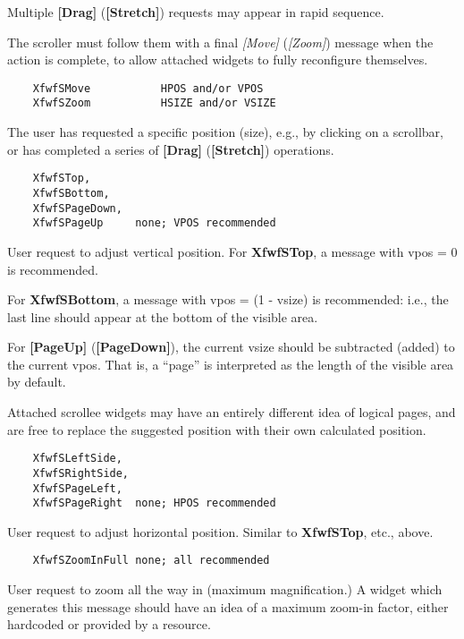         Multiple {\bf [Drag]} ({\bf [Stretch]}) requests may appear in
        rapid sequence.

	The scroller must follow them with a final {\it [Move]} ({\it [Zoom]})
        message when the action is complete, to allow attached widgets to
	fully reconfigure themselves.

\begin{verbatim}
    XfwfSMove           HPOS and/or VPOS
    XfwfSZoom           HSIZE and/or VSIZE
\end{verbatim}

	The user has requested a specific position (size), e.g., by
	clicking on a scrollbar, or has completed a series of {\bf [Drag]}
	({\bf [Stretch]}) operations.

\begin{verbatim}
    XfwfSTop,
    XfwfSBottom,
    XfwfSPageDown,
    XfwfSPageUp   	none; VPOS recommended
\end{verbatim}

    	User request to adjust vertical position.  For {\bf XfwfSTop}, a
	message with vpos = 0 is recommended.
 
	For {\bf XfwfSBottom}, a message with vpos = (1 - vsize) is
	recommended: i.e., the last line should appear at the bottom
	of the visible area.

	For {\bf [PageUp]} ({\bf [PageDown]}), the current vsize should be
	subtracted (added) to the current vpos.  That is, a ``page'' is
	interpreted as the length of the visible area by default.

	Attached scrollee widgets may have an entirely different idea
	of logical pages, and are free to replace the suggested
	position with their own calculated position.

\begin{verbatim}
    XfwfSLeftSide,
    XfwfSRightSide,
    XfwfSPageLeft,
    XfwfSPageRight	none; HPOS recommended
\end{verbatim}

    	User request to adjust horizontal position.  Similar to
	{\bf XfwfSTop}, etc., above.

\begin{verbatim}
    XfwfSZoomInFull	none; all recommended
\end{verbatim}

	User request to zoom all the way in (maximum magnification.) A
	widget which generates this message should have an idea of a
	maximum zoom-in factor, either hardcoded or provided by a
	resource.

